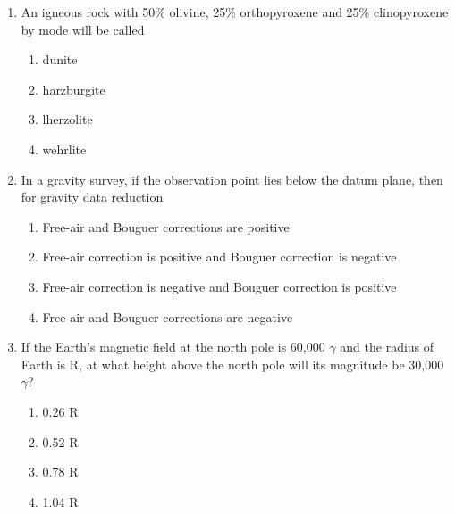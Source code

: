 \documentclass[journal,12pt,onecolumn]{IEEEtran}
\theoremstyle{remark}
\begin{document}
\begin{enumerate}
    \item An igneous rock with 50\% olivine, 25\% orthopyroxene and 25\% clinopyroxene by mode will be called

    \hfill{}
    
    \begin{multicols}{4}
        \begin{enumerate}
            \item dunite
            \item harzburgite
            \item lherzolite
            \item wehrlite
        \end{enumerate}
    \end{multicols}

    \item In a gravity survey, if the observation point lies below the datum plane, then for gravity data reduction

    \hfill{}
    
    \begin{multicols}{1}
        \begin{enumerate}
            \item Free-air and Bouguer corrections are positive
            \item Free-air correction is positive and Bouguer correction is negative
            \item Free-air correction is negative and Bouguer correction is positive
            \item Free-air and Bouguer corrections are negative
        \end{enumerate}
    \end{multicols}

    \item If the Earth's magnetic field at the north pole is 60,000 $\gamma$ and the radius of Earth is R, at what height above the north pole will its magnitude be 30,000 $\gamma$?

    \hfill{}
    
    \begin{multicols}{4}
        \begin{enumerate}
            \item 0.26 R
            \item 0.52 R
            \item 0.78 R
            \item 1.04 R
        \end{enumerate}
    \end{multicols}


\end{enumerate}
\end{document}
